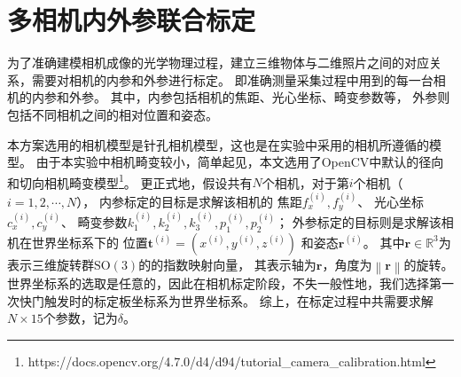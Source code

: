\section{多相机内外参联合标定}
\label{sec:camera_calib}

为了准确建模相机成像的光学物理过程，建立三维物体与二维照片之间的对应关系，需要对相机的内参和外参进行标定。
即准确测量采集过程中用到的每一台相机的内参和外参。
其中，内参包括相机的焦距、光心坐标、畸变参数等，
外参则包括不同相机之间的相对位置和姿态。

本方案选用的相机模型是针孔相机模型，这也是在实验中采用的相机所遵循的模型。
由于本实验中相机畸变较小，简单起见，本文选用了OpenCV中默认的径向和切向相机畸变模型\footnote{https://docs.opencv.org/4.7.0/d4/d94/tutorial\_camera\_calibration.html}。
更正式地，假设共有$N$个相机，对于第$i$个相机（$i=1,2,\cdots,N$），
内参标定的目标是求解该相机的
焦距$f_x^{(i)},f_y^{(i)}$、
光心坐标$c_x^{(i)},c_y^{(i)}$、
畸变参数$k_1^{(i)},k_2^{(i)},k_3^{(i)},p_1^{(i)},p_2^{(i)}$；
外参标定的目标则是求解该相机在世界坐标系下的
位置$\mathbf{t}^{(i)}=\left(x^{(i)},y^{(i)},z^{(i)}\right)$
和姿态$\mathbf{r}^{(i)}$。
其中$\mathbf{r}\in \mathbb{R}^3$为表示三维旋转群$\mathrm{SO(3)}$的的指数映射向量，
其表示轴为$\mathbf{r}$，角度为$\left\| \mathbf{r}\right\|$的旋转。
世界坐标系的选取是任意的，因此在相机标定阶段，不失一般性地，我们选择第一次快门触发时的标定板坐标系为世界坐标系。
综上，在标定过程中共需要求解$N\times 15$个参数，记为$\delta$。

